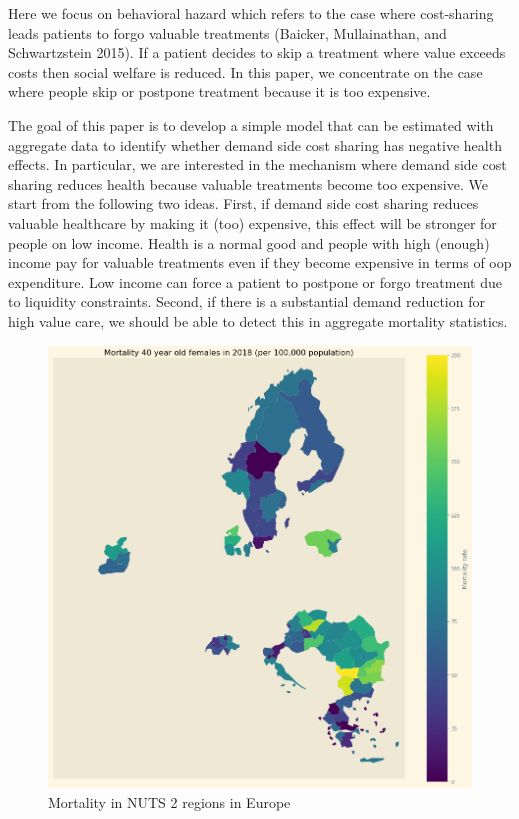 \documentclass[a4paper,12pt]{article}
\makeatletter
\newcommand{\citeprocitem}[2]{\hyper@linkstart{cite}{citeproc_bib_item_#1}#2\hyper@linkend}
\makeatother
\begin{document}
Here we focus on behavioral hazard which refers to the case where cost-sharing leads patients to forgo valuable treatments (\citeprocitem{2}{Baicker, Mullainathan, and Schwartzstein 2015}). If a patient decides to skip a treatment where value exceeds costs then social welfare is reduced. In this paper, we concentrate on the case where people skip or postpone treatment because it is too expensive.

The goal of this paper is to develop a simple model that can be estimated with aggregate data to identify whether demand side cost sharing has negative health effects. In particular, we are interested in the mechanism where demand side cost sharing reduces health because valuable treatments become too expensive. We start from the following two ideas. First, if demand side cost sharing reduces valuable healthcare by making it (too) expensive, this effect will be stronger for people on low income. Health is a normal good and people with high (enough) income pay for valuable treatments even if they become expensive in terms of oop expenditure. Low income can force a patient to postpone or forgo treatment due to liquidity constraints. Second, if there is a substantial demand reduction for high value care, we should be able to detect this in aggregate mortality statistics.

\begin{figure}[htbp]
\centering
\includegraphics[width=.9\linewidth]{./figures/Europe_mortality_40_F_2018.png}
\caption{\label{fig:EUmap}Mortality in NUTS 2 regions in Europe}
\end{figure}
\end{document}
